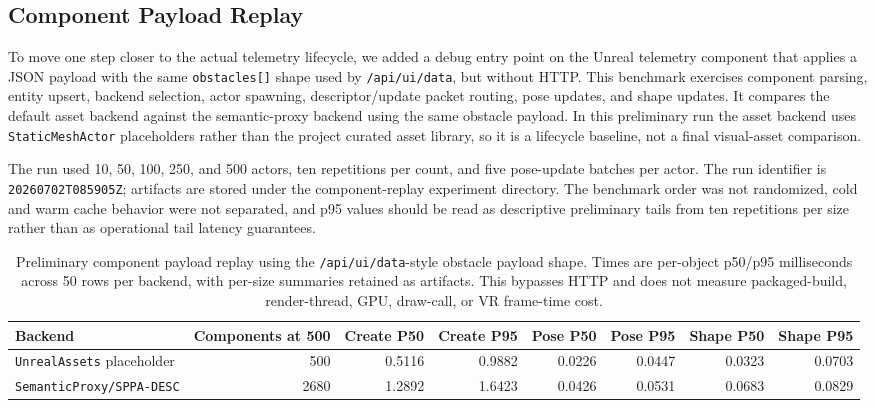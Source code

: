 ﻿\documentclass[11pt,a4paper]{article}
\begin{document}
\subsection{Component Payload Replay}

To move one step closer to the actual telemetry lifecycle, we added a debug
entry point on the Unreal telemetry component that applies a JSON payload with
the same \texttt{obstacles[]} shape used by \texttt{/api/ui/data}, but without
HTTP. This benchmark exercises component parsing, entity upsert, backend
selection, actor spawning, descriptor/update packet routing, pose updates, and
shape updates. It compares the default asset backend against the semantic-proxy
backend using the same obstacle payload. In this preliminary run the asset
backend uses \texttt{StaticMeshActor} placeholders rather than the project
curated asset library, so it is a lifecycle baseline, not a final visual-asset
comparison.

The run used 10, 50, 100, 250, and 500 actors, ten repetitions per count, and
five pose-update batches per actor. The run identifier is
\texttt{20260702T085905Z}; artifacts are stored under the component-replay
experiment directory. The benchmark order was not randomized, cold and warm
cache behavior were not separated, and p95 values should be read as descriptive
preliminary tails from ten repetitions per size rather than as operational tail
latency guarantees.

\begin{table}[h]
\centering
\scriptsize
\setlength{\tabcolsep}{4pt}
\caption{Preliminary component payload replay using the
\texttt{/api/ui/data}-style obstacle payload shape. Times are per-object p50/p95
milliseconds across 50 rows per backend, with per-size summaries retained as
artifacts. This bypasses HTTP and does not measure packaged-build,
render-thread, GPU, draw-call, or VR frame-time cost.}
\label{tab:component-payload-replay}
\begin{tabular}{@{}lrrrrrrr@{}}
\toprule
Backend & Components at 500 & Create P50 & Create P95 & Pose P50 & Pose P95 & Shape P50 & Shape P95 \\
\midrule
\texttt{UnrealAssets} placeholder & 500 & 0.5116 & 0.9882 & 0.0226 & 0.0447 & 0.0323 & 0.0703 \\
\texttt{SemanticProxy/SPPA-DESC} & 2680 & 1.2892 & 1.6423 & 0.0426 & 0.0531 & 0.0683 & 0.0829 \\
\bottomrule
\end{tabular}
\end{table}
\end{document}
